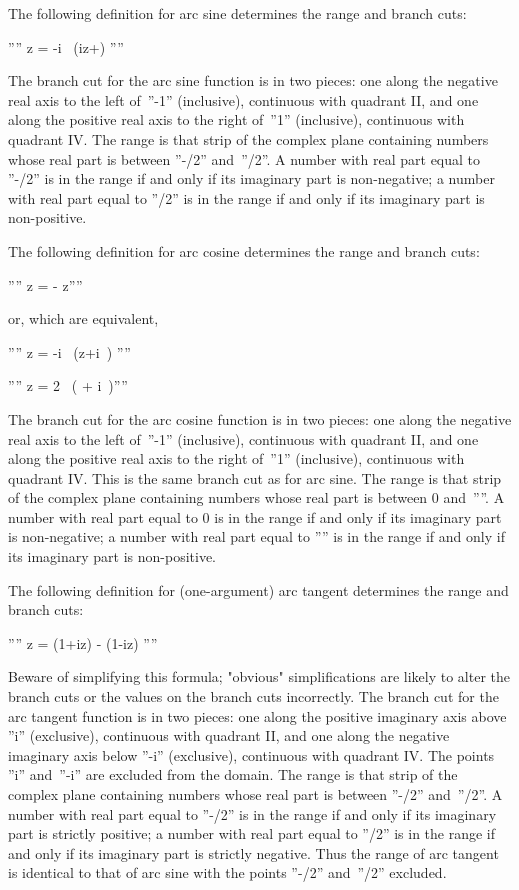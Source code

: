 The following definition for arc sine determines the range and branch cuts:

''''  z = -i\  \Bigl(iz+\Bigr) ''''

The branch cut for the arc sine function is in two pieces: one along the negative real axis to the left of~''-1'' (inclusive), continuous with quadrant II, and one along the positive real axis to the right of~''1'' (inclusive), continuous with quadrant IV. The range is that strip of the complex plane containing numbers whose real part is between ''-\pi/2'' and~''\pi/2''. A number with real part equal to ''-\pi/2'' is in the range if and only if its imaginary part is non-negative; a number with real part equal to ''\pi/2'' is in the range if and only if its imaginary part is non-positive.

The following definition for arc cosine determines the range and branch cuts:

''''  z = {\pi{}}-  z''''

or, which are equivalent,

''''  z = -i\  \Bigl(z+i\ \Bigr) ''''

''''  z = {{2\  \bigl( + i\ \bigr)}}''''

The branch cut for the arc cosine function is in two pieces: one along the negative real axis to the left of~''-1'' (inclusive), continuous with quadrant II, and one along the positive real axis to the right of~''1'' (inclusive), continuous with quadrant IV. This is the same branch cut as for arc sine. The range is that strip of the complex plane containing numbers whose real part is between 0 and~''\pi''. A number with real part equal to 0 is in the range if and only if its imaginary part is non-negative; a number with real part equal to ''\pi'' is in the range if and only if its imaginary part is non-positive.

The following definition for (one-argument) arc tangent determines the range and branch cuts:


''''  z = {{ (1+iz) -  (1-iz)}} ''''


Beware of simplifying this formula; "obvious" simplifications are likely to alter the branch cuts or the values on the branch cuts incorrectly. The branch cut for the arc tangent function is in two pieces: one along the positive imaginary axis above ''i'' (exclusive), continuous with quadrant II, and one along the negative imaginary axis below ''-i'' (exclusive), continuous with quadrant IV. The points ''i'' and~''-i'' are excluded from the domain. The range is that strip of the complex plane containing numbers whose real part is between ''-\pi/2'' and~''\pi/2''. A number with real part equal to ''-\pi/2'' is in the range if and only if its imaginary part is strictly positive; a number with real part equal to ''\pi/2'' is in the range if and only if its imaginary part is strictly negative. Thus the range of arc tangent is identical to that of arc sine with the points ''-\pi/2'' and~''\pi/2'' excluded.

